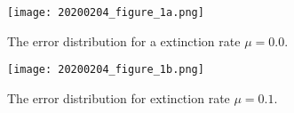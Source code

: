 \begin{figure}[!htbp]
  \texttt{[image: 20200204\_figure\_1a.png]}
  \caption{
    The error distribution for a extinction rate $\mu = 0.0$.
  }
  \label{fig:errors_yule}
\end{figure}

\begin{figure}[!htbp]
  \texttt{[image: 20200204\_figure\_1b.png]}
  \caption{
    The error distribution for extinction rate $\mu = 0.1$.
  }
  \label{fig:errors_bd}
\end{figure}


